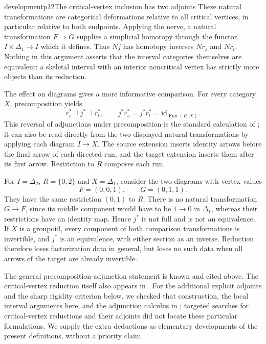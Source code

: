 \begin{dcomment}{development}{p12}{The critical-vertex inclusion has two adjoints}
These natural transformations are categorical deformations relative to all critical vertices, in particular relative to both endpoints. Applying the nerve, a natural transformation $F\Rightarrow G$ supplies a simplicial homotopy through the functor $I\times\Delta_1\to I$ which it defines. Thus $Nj$ has homotopy inverses $Nr_s$ and $Nr_t$. Nothing in this argument asserts that the interval categories themselves are equivalent: a skeletal interval with an interior noncritical vertex has strictly more objects than its reduction.

The effect on diagrams gives a more informative comparison. For every category $X$, precomposition yields
\[
 r_s^*\dashv j^*\dashv r_t^*,\qquad
 j^*r_s^*=j^*r_t^*=\mathrm{id}_{\operatorname{Fun}(R,X)}.
\]
This reversal of adjunctions under precomposition is the standard calculation of \citet[Proposition~4.3.7]{Riehl2016}; it can also be read directly from the two displayed natural transformations by applying each diagram $I\to X$. The source extension inserts identity arrows before the final arrow of each directed run, and the target extension inserts them after its first arrow. Restriction to $R$ composes each run.

For $I=\Delta_2$, $R=\{0,2\}$ and $X=\Delta_1$, consider the two diagrams with vertex values
\[
 F=(0,0,1),\qquad G=(0,1,1).
\]
They have the same restriction $(0,1)$ to $R$. There is no natural transformation $G\to F$, since its middle component would have to be $1\to0$ in $\Delta_1$, whereas their restrictions have an identity map. Hence $j^*$ is not full and is not an equivalence. If $X$ is a groupoid, every component of both comparison transformations is invertible, and $j^*$ is an equivalence, with either section as an inverse. Reduction therefore loses factorization data in general, but loses no such data when all arrows of the target are already invertible.

The general precomposition-adjunction statement is known and cited above. The critical-vertex reduction itself also appears in \citet[Lemma~4.16]{ArakawaCnossen2026}. For the additional explicit adjoints and the sharp rigidity criterion below, we checked that construction, the local interval arguments here, and the adjunction calculus in \citet[\S4.3]{Riehl2016}; targeted searches for critical-vertex reductions and their adjoints did not locate these particular formulations. We supply the extra deductions as elementary developments of the present definitions, without a priority claim.
\end{dcomment}

